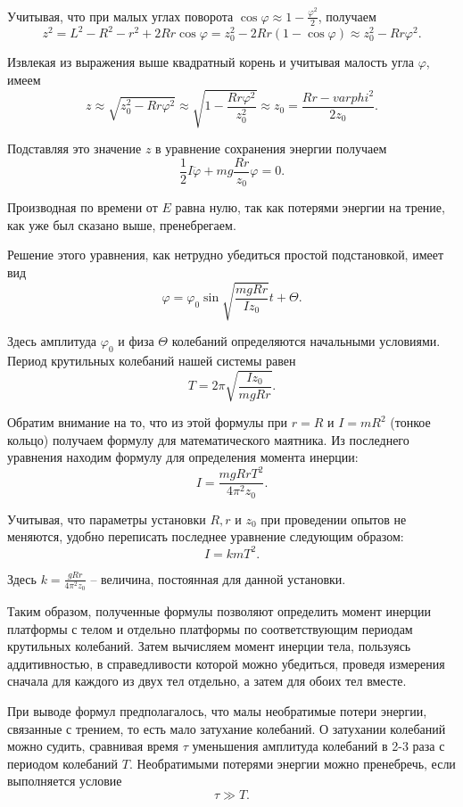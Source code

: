 \documentclass[a4paper,12pt]{article} %
\begin{document}
Учитывая, что при малых углах поворота $\cos{\varphi} \approx 1 -\frac{\varphi^2}{2}$, получаем 
\[ z^2 = L^2 - R^2 - r^2 +2Rr\cos{\varphi} = z_0^2 - 2Rr(1 - \cos{\varphi})\approx z_0^2 - Rr\varphi^2 .\]

Извлекая из выражения выше квадратный корень и учитывая малость угла $\varphi$, имеем 
\[ z \approx \sqrt{z_0^2 - Rr\varphi^2}\approx \sqrt{1-\frac{Rr\varphi^2}{z_0^2}}\approx z_0 = \frac{Rr-varphi^2}{2z_0} .\]

Подставляя это значение $z$ в уравнение сохранения энергии получаем 
\[ \frac{1}{2}I \ddot{\varphi} + mg\frac{Rr}{z_0}\varphi = 0.\] 

Производная по времени от $E$ равна нулю, так как потерями энергии на трение, как уже был сказано выше, пренебрегаем.

Решение этого уравнения, как нетрудно убедиться простой подстановкой, имеет вид 
\[ \varphi = \varphi_0\sin{\sqrt{\frac{mgRr}{Iz_0}}t + \Theta} .\]

Здесь амплитуда $\varphi_0$ и физа $\Theta$ колебаний определяются начальными условиями. Период крутильных колебаний нашей системы равен 
\[ T = 2\pi \sqrt{\frac{Iz_0}{mgRr}}.\]

Обратим внимание на то, что из этой формулы при $r = R$ и $I = mR^2$ (тонкое кольцо) получаем формулу для математического маятника. Из последнего уравнения находим формулу для определения момента инерции:
\[ I = \frac{mgRrT^2}{4\pi^2 z_0}.\]

Учитывая, что параметры установки $R,r$ и $z_0$ при проведении опытов не меняются, удобно переписать последнее уравнение следующим образом: 
\[ I = kmT^2.\]

Здесь $k = \frac{gRr}{4\pi^2 z_0}$ -- величина, постоянная для данной установки.

Таким образом, полученные формулы позволяют определить момент инерции платформы с телом и отдельно платформы по соответствующим периодам крутильных колебаний. Затем вычисляем момент инерции тела, пользуясь аддитивностью, в справедливости которой можно убедиться, проведя измерения сначала для каждого из двух тел отдельно, а затем для обоих тел вместе.

При выводе формул предполагалось, что малы необратимые потери энергии, связанные с трением, то есть мало затухание колебаний. О затухании колебаний можно судить, сравнивая время $\tau$ уменьшения амплитуда колебаний в 2-3 раза с периодом колебаний $T$. Необратимыми потерями энергии можно пренебречь, если выполняется условие 
\[ \tau \gg T .\]
\end{document}

